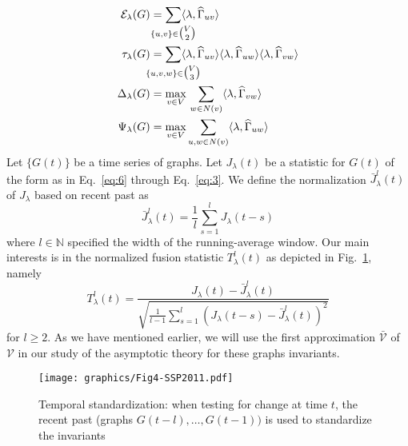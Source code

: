 \documentclass[final]{IEEEtran}
\theoremstyle{definition}
\def\clap#1{\hbox to 0pt{\hss#1\hss}}
\def\mathclap{\mathpalette\mathclapinternal}
\def\mathclapinternal#1#2{%
\clap{$\mathsurround=0pt#1{#2}$}%
}
\begin{document}
\begin{align}
  \label{eq:6}
  \mathcal{E}_{\lambda}(G) &= \sum_{\mathclap{\{u,v\} \in
      \tbinom{V}{2}}} \langle
  \lambda, \widehat{\Gamma}_{uv} \rangle \\
  \tau_{\lambda}(G) &= \sum_{\mathclap{\{u,v,w\} \in \tbinom{V}{3}}} \langle
  \lambda, \widehat{\Gamma}_{uv} \rangle \langle \lambda,
  \widehat{\Gamma}_{uw} \rangle \langle \lambda, \widehat{\Gamma}_{vw}
  \rangle \\ 
\Delta_{\lambda}(G) &= \max_{v \in V} \, \sum_{w \in N(v)} \langle
\lambda, \widehat{\Gamma}_{vw} \rangle \\
\label{eq:3}
  \Psi_{\lambda}(G) &= \max_{v \in V} \sum_{u,w \in N(v)} \langle
  \lambda, \widehat{\Gamma}_{uw} \rangle
  \end{align}
  Let $\{G(t)\}$ be a time series of graphs. Let $J_{\lambda}(t)$ be a
  statistic for $G(t)$ of the form as in Eq.~\eqref{eq:6} through
  Eq.~\eqref{eq:3}. We define the normalization
  $\bar{J}^{l}_\lambda(t)$ of $J_{\lambda}$ based on recent past as
\begin{equation}
  \label{eq:4}
 \bar{J}^{l}_{\lambda}(t) = \frac{1}{l}\sum_{s = 1}^{l} J_{\lambda}(t - s) 
\end{equation}
where $l \in \mathbb{N}$ specified the width of the running-average
window. Our main interests is in the normalized fusion
statistic $T_{\lambda}^{l}(t)$ as depicted in Fig.~\ref{fig:temporal}, namely
\begin{equation}
  \label{eq:7}
 T_{\lambda}^{l}(t) = %
   \frac{J_{\lambda}(t) -
     \bar{J}_{\lambda}^{l}(t)}{\sqrt{\tfrac{1}{l-1}
       \sum_{s=1}^{l}(J_{\lambda}(t - s) - \bar{J}_{\lambda}^{l}(t))^2}}
\end{equation}
for $l \geq 2$. As we have mentioned earlier, we will use the first
approximation $\bar{\mathscr{V}}$ of $\mathscr{V}$ in our study of the 
asymptotic theory for these graphs invariants.   
\begin{figure}[htbp]
  \centering
  \texttt{[image: graphics/Fig4-SSP2011.pdf]}
  \caption{Temporal standardization: when testing for change at time
    $t$, the recent past (graphs $G(t - l), \dots, G(t-1))$ is used to
    standardize the invariants}
  \label{fig:temporal}
\end{figure}
\end{document}
